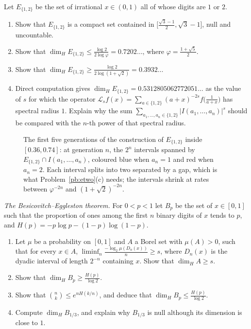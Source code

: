 \begin{exercise}[$\star\star\star$]\label{pb:etwo}
Let $E_{\{1,2\}}$ be the set of irrational $x\in(0,1)$ all of whose digits are $1$ or $2$.
\begin{enumerate}[label=(\alph*)]
\item Show that $E_{\{1,2\}}$ is a compact set contained in $\bigl[\frac{\sqrt3-1}2,\sqrt3-1\bigr]$, null and uncountable.
\item Show that $\dim_HE_{\{1,2\}}\le\frac{\log2}{2\log\varphi}=0.7202\ldots$, where $\varphi=\frac{1+\sqrt5}2$.
\item Show that $\dim_HE_{\{1,2\}}\ge\frac{\log2}{2\log(1+\sqrt2)}=0.3932\ldots$
\item Direct computation gives $\dim_HE_{\{1,2\}}=0.5312805062772051\ldots$ as the value of $s$ for which the operator
$\mathcal L_sf(x)=\sum_{a\in\{1,2\}}(a+x)^{-2s}f\bigl(\frac1{a+x}\bigr)$ has spectral radius $1$. Explain why the sum
$\sum_{a_1,\dots,a_n\in\{1,2\}}|I(a_1,\dots,a_n)|^s$ should be compared with the $n$-th power of that spectral radius.
\end{enumerate}
\end{exercise}

\begin{figure}[ht]
\centering
{}
\caption{The first five generations of the construction of $E_{\{1,2\}}$ inside $[0.36,0.74]$: at generation $n$, the $2^n$ intervals spanned by
$E_{\{1,2\}}\cap I(a_1,\dots,a_n)$, coloured blue when $a_n=1$ and red when $a_n=2$. Each interval splits into two separated by a gap, which is
what Problem~\ref{pb:etwo}(c) needs; the intervals shrink at rates between $\varphi^{-2n}$ and $(1+\sqrt2)^{-2n}$.}\label{fig:etwo}
\end{figure}

\begin{exercise}[$\star\star\star$]\label{pb:eggleston}
\emph{The Besicovitch--Eggleston theorem.} For $0<p<1$ let $B_p$ be the set of $x\in[0,1]$ such that the proportion of ones among the first $n$
binary digits of $x$ tends to $p$, and $H(p)=-p\log p-(1-p)\log(1-p)$.
\begin{enumerate}[label=(\alph*)]
\item Let $\mu$ be a probability on $[0,1]$ and $A$ a Borel set with $\mu(A)>0$, such that for every $x\in A$,
$\liminf_n\frac{-\log_2\mu(D_n(x))}n\ge s$, where $D_n(x)$ is the dyadic interval of length $2^{-n}$ containing $x$. Show that $\dim_HA\ge s$.
\item Show that $\dim_HB_p\ge\frac{H(p)}{\log2}$.
\item Show that $\binom nk\le e^{nH(k/n)}$, and deduce that $\dim_HB_p\le\frac{H(p)}{\log2}$.
\item Compute $\dim_HB_{1/3}$, and explain why $B_{1/3}$ is null although its dimension is close to $1$.
\end{enumerate}
\end{exercise}


